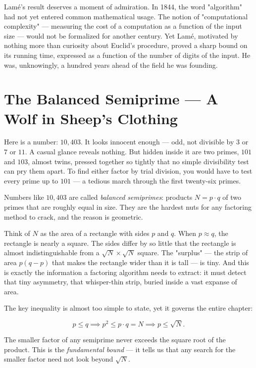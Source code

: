 \documentclass[11pt,twoside,openright]{book}
\theoremstyle{definition}
\theoremstyle{remark}
\begin{document}
Lam\'e's result deserves a moment of admiration. In 1844, the word "algorithm" had not yet entered common mathematical usage. The notion of "computational complexity" --- measuring the cost of a computation as a function of the input size --- would not be formalized for another century. Yet Lam\'e, motivated by nothing more than curiosity about Euclid's procedure, proved a sharp bound on its running time, expressed as a function of the number of digits of the input. He was, unknowingly, a hundred years ahead of the field he was founding.


\section{The Balanced Semiprime --- A Wolf in Sheep's Clothing}

Here is a number: $10{,}403$. It looks innocent enough --- odd, not divisible by $3$ or $7$ or $11$. A casual glance reveals nothing. But hidden inside it are two primes, $101$ and $103$, almost twins, pressed together so tightly that no simple divisibility test can pry them apart. To find either factor by trial division, you would have to test every prime up to $101$ --- a tedious march through the first twenty-six primes.

Numbers like $10{,}403$ are called \textit{balanced semiprimes}: products $N = p \cdot q$ of two primes that are roughly equal in size. They are the hardest nuts for any factoring method to crack, and the reason is geometric.

Think of $N$ as the area of a rectangle with sides $p$ and $q$. When $p \approx q$, the rectangle is nearly a square. The sides differ by so little that the rectangle is almost indistinguishable from a $\sqrt{N} \times \sqrt{N}$ square. The "surplus" --- the strip of area $p(q - p)$ that makes the rectangle wider than it is tall --- is tiny. And this is exactly the information a factoring algorithm needs to extract: it must detect that tiny asymmetry, that whisper-thin strip, buried inside a vast expanse of area.

The key inequality is almost too simple to state, yet it governs the entire chapter:

\[p \le q \implies p^2 \le p \cdot q = N \implies p \le \sqrt{N}.\]

The smaller factor of any semiprime never exceeds the square root of the product. This is the \textit{fundamental bound} --- it tells us that any search for the smaller factor need not look beyond $\sqrt{N}$.
\end{document}
